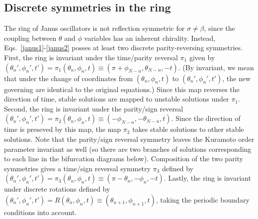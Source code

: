 \documentclass[aps,pre,amsmath,amssymb,floatfix,onecolumn,notitlepage,10pt]{revtex4-1}
\begin{document}
\subsection{Discrete symmetries in the ring}
The ring of Janus oscillators is not reflection symmetric for $\sigma \neq \beta$, since the coupling between $\theta$ and $\phi$ variables has an inherent chirality. Instead, Eqs.~\eqref{janus1}-\eqref{janus2} posses at least two discrete parity-reversing symmetries. First, the ring is invariant under the time/parity reversal $\pi_1$ given by $(\theta_n',\phi_n',t') = \pi_1(\theta_n,\phi_n,t) \equiv (\pi+\phi_{N-n},\theta_{N-n},-t)$. (By invariant, we mean that under the change of coordinates from $(\theta_n,\phi_n,t)$ to $(\theta_n',\phi_n',t')$, the new governing are identical to the original equations.)
Since this map reverses the direction of time, stable solutions are mapped to unstable solutions under $\pi_1$.  Second, the ring is invariant under the parity/sign reversal $(\theta_n',\phi_n',t') = \pi_2(\theta_n,\phi_n,t) \equiv (-\phi_{N-n},-\theta_{N-n},t)$. Since the direction of time is preseved by this map, the map $\pi_2$ takes stable solutions to other stable solutions.  Note that the parity/sign reversal symmetry leaves the Kuramoto order parameter invariant as well (so there are two branches of solutions corresponding to each line in the bifurcation diagrams below). Composition of the two parity symmetries gives a time/sign reversal symmetry $\pi_3$ defined by $(\theta_n',\phi_n',t')=\pi_3(\theta_n,\phi_n,t)\equiv(\pi-\theta_n,-\phi_n,-t)$. Lastly, the ring is invariant under discrete rotations defined by $(\theta_n',\phi_n',t')=R(\theta_n,\phi_n,t)\equiv(\theta_{n+1},\phi_{n+1},t)$, taking the periodic boundary conditions into account.
\end{document}
